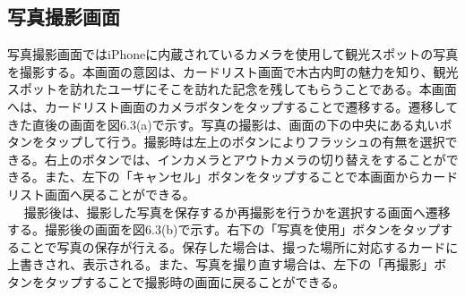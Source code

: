 \subsection{写真撮影画面}
写真撮影画面ではiPhoneに内蔵されているカメラを使用して観光スポットの写真を撮影する。本画面の意図は、カードリスト画面で木古内町の魅力を知り、観光スポットを訪れたユーザにそこを訪れた記念を残してもらうことである。本画面へは、カードリスト画面のカメラボタンをタップすることで遷移する。遷移してきた直後の画面を図6.3(a)で示す。写真の撮影は、画面の下の中央にある丸いボタンをタップして行う。撮影時は左上のボタンによりフラッシュの有無を選択できる。右上のボタンでは、インカメラとアウトカメラの切り替えをすることができる。また、左下の「キャンセル」ボタンをタップすることで本画面からカードリスト画面へ戻ることができる。\\　
撮影後は、撮影した写真を保存するか再撮影を行うかを選択する画面へ遷移する。撮影後の画面を図6.3(b)で示す。右下の「写真を使用」ボタンをタップすることで写真の保存が行える。保存した場合は、撮った場所に対応するカードに上書きされ、表示される。また、写真を撮り直す場合は、左下の「再撮影」ボタンをタップすることで撮影時の画面に戻ることができる。

